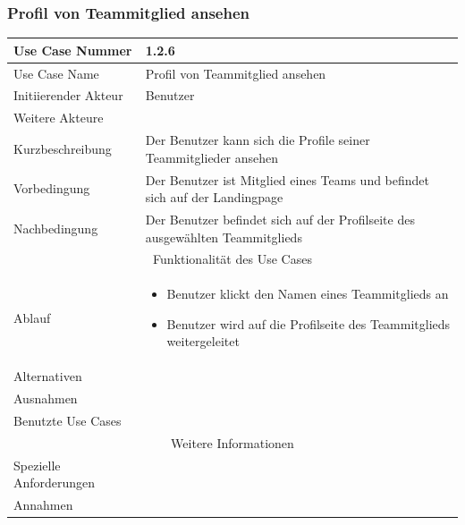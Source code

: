 \documentclass[10pt,a4paper]{article}
\begin{document}
		\subsubsection{Profil von Teammitglied ansehen}
		\begin{tabular}{|l|p{.5\linewidth}|}
			\hline Use Case Nummer & 1.2.6 \\ 
			\hline Use Case Name & Profil von Teammitglied ansehen \\ 
			\hline Initiierender Akteur & Benutzer \\
			\hline Weitere Akteure & \\
			\hline Kurzbeschreibung & Der Benutzer kann sich die Profile seiner Teammitglieder ansehen \\
			\hline Vorbedingung & Der Benutzer ist Mitglied eines Teams und befindet sich auf der Landingpage \\
			\hline Nachbedingung & Der Benutzer befindet sich auf der Profilseite des ausgewählten Teammitglieds \\
			\hline \multicolumn{2}{|c|}{Funktionalität des Use Cases}\\
			\hline Ablauf & \begin{itemize}
				\item Benutzer klickt den Namen eines Teammitglieds an
				\item Benutzer wird auf die Profilseite des Teammitglieds weitergeleitet
			\end{itemize} \\
			\hline Alternativen & \\
			\hline Ausnahmen & \\
			\hline Benutzte Use Cases & \\
			\hline \multicolumn{2}{|c|}{Weitere Informationen} \\
			\hline Spezielle Anforderungen & \\
			\hline Annahmen & \\
			\hline
		\end{tabular}
					
\end{document}
